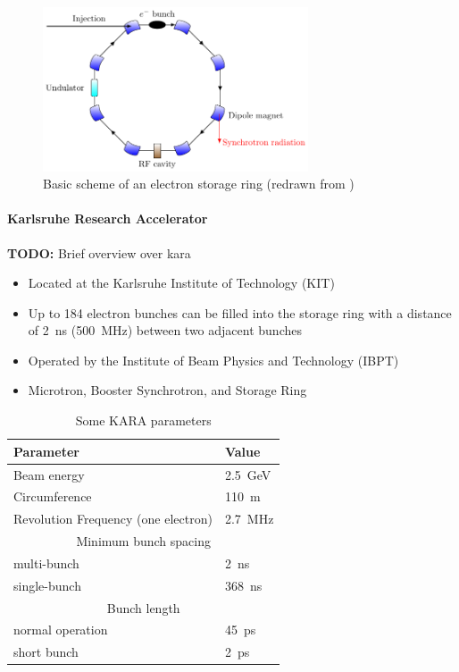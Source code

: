 \begin{figure}[tbh]
	\centering
	\includegraphics[width=0.7\textwidth]{chap/02-theory/img/synchrotron}
	\caption{Basic scheme of an electron storage ring (redrawn from \cite{roussel2014})}
	\label{fig:storageRing}
\end{figure}
\paragraph{Karlsruhe Research Accelerator}
\textbf{TODO:} Brief overview over \gls{kara}
\begin{itemize}[noitemsep]
	\item Located at the Karlsruhe Institute of Technology (KIT)
	\item Up to 184 electron bunches can be filled into the storage ring with a distance of \SI{2}{\nano\second} (\SI{500}{\mega\hertz}) between two adjacent bunches
	\item Operated by the Institute of Beam Physics and Technology (IBPT)
	\item Microtron, Booster Synchrotron, and Storage Ring
\end{itemize}

\begin{table}[tbh]
	\caption{Some KARA parameters \cite{rota2018}}
	\label{tab:kara}
	\centering
	\begin{tabular}{ll}
		\toprule
		\textbf{Parameter}                  & \textbf{Value}                \\ \midrule
		Beam energy                         & \SI{2.5}{\giga \electronvolt} \\
		Circumference                       & \SI{110}{\meter}              \\
		Revolution Frequency (one electron) & \SI{2.7}{\mega \hertz}        \\
		             \multicolumn{2}{c}{Minimum bunch spacing}              \\
		\quad multi-bunch                   & \SI{2}{\nano \second}         \\
		\quad single-bunch                  & \SI{368}{\nano \second}       \\
		                 \multicolumn{2}{c}{Bunch length}                   \\
		\quad normal operation              & \SI{45}{\pico \second}        \\
		\quad short bunch                   & \SI{2}{\pico \second}         \\ \bottomrule
	\end{tabular}
\end{table}

